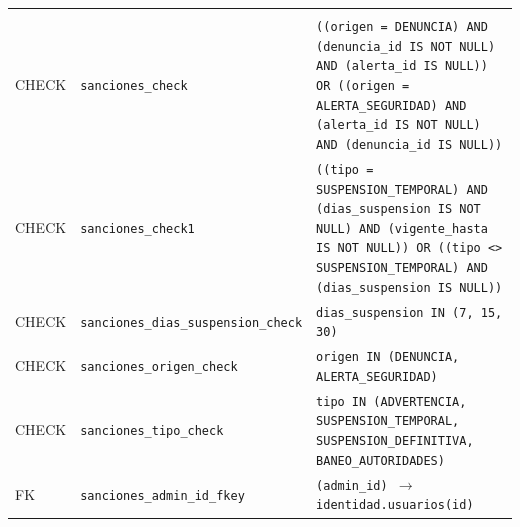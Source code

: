 {\small
\begin{xltabular}{\textwidth}{@{}>{\raggedright\arraybackslash}p{1.7cm} >{\raggedright\arraybackslash}p{4.6cm} L@{}}
    \toprule
     &  &  \\
    \midrule
    \endfirsthead
    \toprule
     &  &  \\
    \midrule
    \endhead
    \bottomrule
    \endfoot
    CHECK & \texttt{sanciones\_\allowbreak{}check} & \texttt{(\allowbreak{}(\allowbreak{}origen = \textquotesingle{}DENUNCIA\textquotesingle{}) AND (\allowbreak{}denuncia\_\allowbreak{}id IS NOT NULL) AND (\allowbreak{}alerta\_\allowbreak{}id IS NULL)) OR (\allowbreak{}(\allowbreak{}origen = \textquotesingle{}ALERTA\_\allowbreak{}SEGURIDAD\textquotesingle{}) AND (\allowbreak{}alerta\_\allowbreak{}id IS NOT NULL) AND (\allowbreak{}denuncia\_\allowbreak{}id IS NULL))} \\
    CHECK & \texttt{sanciones\_\allowbreak{}check1} & \texttt{(\allowbreak{}(\allowbreak{}tipo = \textquotesingle{}SUSPENSION\_\allowbreak{}TEMPORAL\textquotesingle{}) AND (\allowbreak{}dias\_\allowbreak{}suspension IS NOT NULL) AND (\allowbreak{}vigente\_\allowbreak{}hasta IS NOT NULL)) OR (\allowbreak{}(\allowbreak{}tipo \textless{}\textgreater{} \textquotesingle{}SUSPENSION\_\allowbreak{}TEMPORAL\textquotesingle{}) AND (\allowbreak{}dias\_\allowbreak{}suspension IS NULL))} \\
    CHECK & \texttt{sanciones\_\allowbreak{}dias\_\allowbreak{}suspension\_\allowbreak{}check} & \texttt{dias\_\allowbreak{}suspension IN (\allowbreak{}7,\allowbreak{} 15,\allowbreak{} 30)} \\
    CHECK & \texttt{sanciones\_\allowbreak{}origen\_\allowbreak{}check} & \texttt{origen IN (\allowbreak{}\textquotesingle{}DENUNCIA\textquotesingle{},\allowbreak{} \textquotesingle{}ALERTA\_\allowbreak{}SEGURIDAD\textquotesingle{})} \\
    CHECK & \texttt{sanciones\_\allowbreak{}tipo\_\allowbreak{}check} & \texttt{tipo IN (\allowbreak{}\textquotesingle{}ADVERTENCIA\textquotesingle{},\allowbreak{} \textquotesingle{}SUSPENSION\_\allowbreak{}TEMPORAL\textquotesingle{},\allowbreak{} \textquotesingle{}SUSPENSION\_\allowbreak{}DEFINITIVA\textquotesingle{},\allowbreak{} \textquotesingle{}BANEO\_\allowbreak{}AUTORIDADES\textquotesingle{})} \\
    FK & \texttt{sanciones\_\allowbreak{}admin\_\allowbreak{}id\_\allowbreak{}fkey} & \texttt{(\allowbreak{}admin\_\allowbreak{}id) $\rightarrow$ identidad.usuarios(\allowbreak{}id)} \\

\end{xltabular}}
